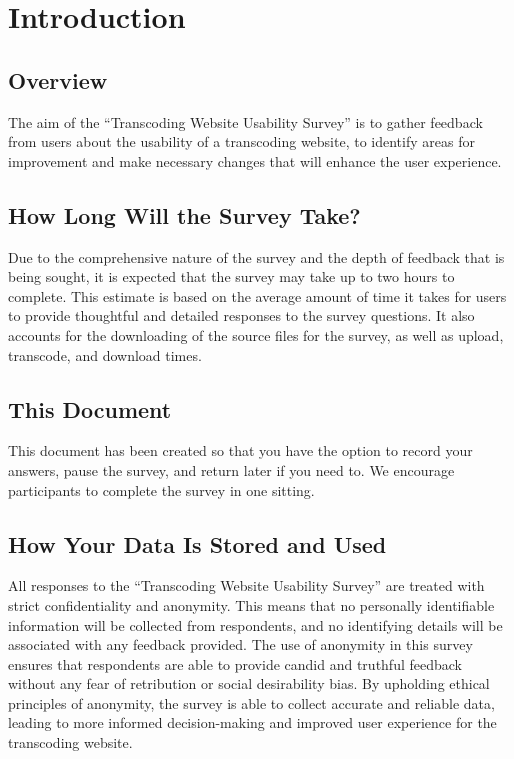 \chapter{Introduction}
\section{Overview}
The aim of the “Transcoding Website Usability Survey” is to gather feedback from users about the usability of a transcoding website, to identify areas for improvement and make necessary changes that will enhance the user experience.

\section{How Long Will the Survey Take?}
Due to the comprehensive nature of the survey and the depth of feedback that is being sought, it is expected that the survey may take up to two hours to complete. This estimate is based on the average amount of time it takes for users to provide thoughtful and detailed responses to the survey questions. It also accounts for the downloading of the source files for the survey, as well as upload, transcode, and download times.

\section{This Document}
This document has been created so that you have the option to record your answers, pause the survey, and return later if you need to. We encourage participants to complete the survey in one sitting. 

\clearpage

\section{How Your Data Is Stored and Used}
All responses to the “Transcoding Website Usability Survey” are treated with strict confidentiality and anonymity. This means that no personally identifiable information will be collected from respondents, and no identifying details will be associated with any feedback provided. The use of anonymity in this survey ensures that respondents are able to provide candid and truthful feedback without any fear of retribution or social desirability bias. By upholding ethical principles of anonymity, the survey is able to collect accurate and reliable data, leading to more informed decision-making and improved user experience for the transcoding website.

